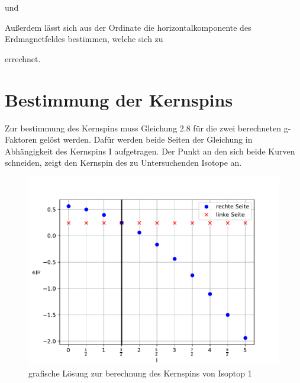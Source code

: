 

und



Außerdem lässt sich aus der Ordinate die horizontalkomponente des Erdmagnetfeldes bestimmen,
welche sich zu



errechnet.

\section{Bestimmung der Kernspins}
Zur bestimmung des Kernspins muss Gleichung 2.8 für die zwei berechneten g-Faktoren gelöst werden. Dafür werden beide Seiten der Gleichung in Abhängigkeit
des Kernspins I aufgetragen. Der Punkt an den sich beide Kurven schneiden, zeigt den Kernspin des zu Untersuchenden Isotope an.

\begin{figure}[H]
\centering
\includegraphics[scale=0.8]{./optischesPumpen/img/coreSpin1.pdf}
\caption{grafische Lösung zur berechnung des Kernspins von Isoptop 1}
\label{LandeIso1}
\end{figure}

